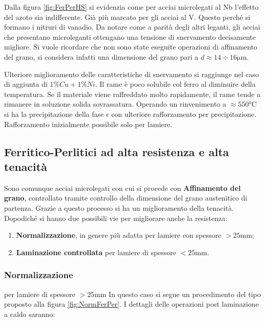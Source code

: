 Dalla figura \ref{fig:FerPerHS} si evidenzia come per acciai microlegati
al Nb l'effetto del azoto sia indifferente. Già più marcato per gli 
acciai al V. Questo perché si formano i nitruri di vanadio.
Da notare come a parità degli altri leganti, gli acciai che presentano
microleganti ottengano una tensione di snervamento decisamente migliore.
Si vuole ricordare che non sono state eseguite operazioni di affinamento 
del grano, si considera infatti una dimensione del grano pari a $d 
\approx 14 \div 16\unit{\um}$.

Ulteriore miglioramento delle caratteristiche di snervamento si 
raggiunge nel caso di aggiunta di $1\%Cu + 1\%Ni$.
Il rame è poco solubile col ferro al diminuire della temperatura.
Se il materiale viene raffreddato molto rapidamente, il rame tende a 
rimanere in soluzione solida sovrassatura.
Operando un rinvenimento a $\approx 550\unit{\celsius}$ si ha la 
precipitazione della fase $\epsilon$ con ulteriore rafforzamento per 
precipitazione.
Rafforzamento inizialmente possibile solo per lamiere.


\subsection{Ferritico-Perlitici ad alta resistenza e alta tenacità}
Sono comunque acciai microlegati con cui si procede con 
\textbf{Affinamento del grano}, controllato tramite controllo della
dimensione del grano austenitico di partenza.
Grazie a questo processo si ha un miglioramento della tenacità.
Dopodiché si hanno due possibili vie per migliorare anche la resistenza:
\begin{enumerate}
\item \textbf{Normalizzazione}, in genere più adatta per lamiere con 
spessore $>25\unit{\mm}$;
\item \textbf{Laminazione controllata} per lamiere di spessore 
$<25\unit{\mm}$.
\end{enumerate}

\subsubsection*{Normalizzazione} per lamiere di spessore $>25\unit{\mm}$
In questo caso si segue un procedimento del tipo proposto alla figura \ref{fig:NormFerPer}.
I dettagli delle operazioni post laminazione a caldo saranno:

